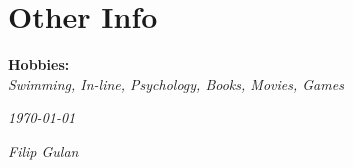 \documentclass[]{friggeri-cv}
\begin{document}
\section{Other Info}
\textbf{Hobbies:}\\
\emph{Swimming, In-line, Psychology, Books, Movies, Games}
\\
\begin{flushleft}
\emph{\today}
\end{flushleft}
\begin{flushright}
\emph{Filip Gulan}
\end{flushright}
\end{document}
